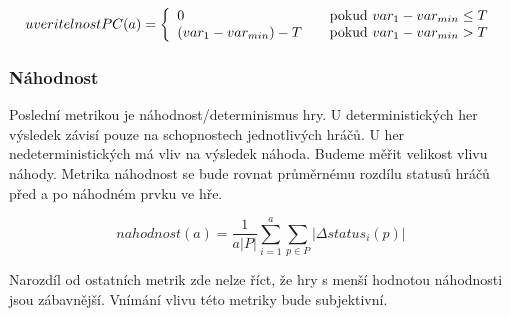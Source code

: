 	\[
	uveritelnostPC(a) = \left\{
  \begin{array}{l l}
    0 & \quad \text{pokud $var_1 - var_{min} \leq T$}\\
    (var_1 - var_{min}) - T & \quad \text{pokud $var_1 - var_{min} > T$}
  \end{array} \right.
\]


\subsubsection{Náhodnost}

Poslední metrikou je náhodnost/determinismus hry. U deterministických her výsledek závisí pouze na schopnostech jednotlivých hráčů. U her nedeterministických má vliv na výsledek náhoda. Budeme měřit velikost vlivu náhody. Metrika náhodnost se bude rovnat průměrnému rozdílu statusů hráčů před a po náhodném prvku ve hře.

	\[
	nahodnost(a) = \frac{1}{a |P|}\sum_{i=1}^a{\sum_{p \in P} |\Delta status_i(p)|}
\]

Narozdíl od ostatních metrik zde nelze říct, že hry s menší hodnotou náhodnosti jsou zábavnější. Vnímání vlivu této metriky bude subjektivní.
